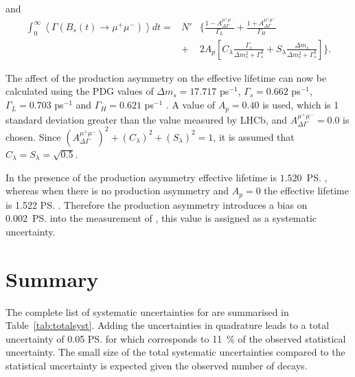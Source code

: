 and
\begin{eqnarray}
 \int_0^\infty \left<\Gamma\left( B_s(t) \rightarrow \mu^{+} \mu^{-} \right)\right> dt = &N'&\bigg\{ \frac{1-A_{\Delta\Gamma}^{\mu^{+} \mu^{-}}}{\Gamma_{L}} + \frac{1+A_{\Delta\Gamma}^{\mu^{+} \mu^{-}}}{\Gamma_{H}} \nonumber \\
&+& 2A_p \left[C_{\lambda}\frac{\Gamma_{s}}{\Delta m_{s}^2 + \Gamma_{s}^2} + S_{\lambda}\frac{\Delta m_{s}}{\Delta m_{s}^2 + \Gamma_{s}^2} \right] \bigg\}.
\end{eqnarray}

The affect of the production asymmetry on the effective lifetime can now be calculated using the PDG values of $\Delta m_{s} = 17.717$ ps$^{-1}$, $\Gamma_{s} = 0.662$ ps$^{-1}$, $\Gamma_{L} = 0.703 $  ps$^{-1}$ and $\Gamma_{H}= 0.621$  ps$^{-1}$ \cite{Olive:2016xmw,}. A value of $A_{p} = 0.40$ is used, which is 1 standard deviation greater than the value measured by LHCb, and $A_{\Delta\Gamma}^{\mu^{+} \mu^{-}} = 0.0$ is chosen. Since $(A_{\Delta\Gamma}^{\mu^{+} \mu^{-}})^{2} + (C_{\lambda})^{2} + (S_{\lambda})^{2} = 1$, it is assumed that $C_{\lambda} = S_{\lambda} = \sqrt{0.5}$. 

In the presence of the production asymmetry \bsmumu effective lifetime is $1.520$~\ps, whereas when there is no production asymmetry and $A_{p} = 0$ the effective lifetime is 1.522 \ps. Therefore the production asymmetry introduces a bias on 0.002~\ps into the measurement of \tmumu, this value is assigned as a systematic uncertainty. 

\section{Summary}
\label{sec:systematicsSummary}

The complete list of systematic uncertainties for \tmumu are summarised in Table~\ref{tab:totalsyst}. Adding the uncertainties in quadrature leads to a total uncertainty of 0.05 \ps for \tmumu which corresponds to 11~$\%$ of the observed statistical uncertainty. The small size of the total systematic uncertainties compared to the statistical uncertainty is expected given the observed number of decays. 


